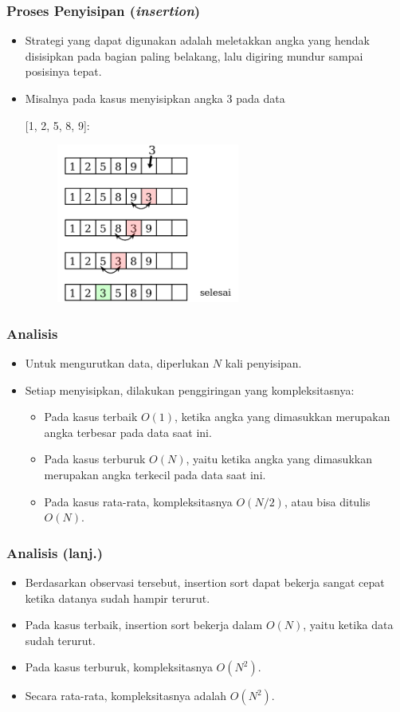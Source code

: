\begin{frame}
\frametitle{Proses Penyisipan (\textit{insertion})}
  \begin{itemize}
    \item Strategi yang dapat digunakan adalah meletakkan angka yang hendak disisipkan pada bagian paling belakang, lalu digiring mundur sampai posisinya tepat.
    \item Misalnya pada kasus menyisipkan angka 3 pada data 
    
    [1, 2, 5, 8, 9]:
    
    \begin{figure}
      \includegraphics[width=6cm]{asset/insertion-sort-2.pdf}
    \end{figure}
  \end{itemize}
\end{frame}

\begin{frame}
\frametitle{Analisis}
  \begin{itemize}
    \item Untuk mengurutkan data, diperlukan $N$ kali penyisipan.
    \item Setiap menyisipkan, dilakukan penggiringan yang kompleksitasnya:
    \begin{itemize}
      \item Pada kasus terbaik $O(1)$, ketika angka yang dimasukkan merupakan angka terbesar pada data saat ini.
      \item Pada kasus terburuk $O(N)$, yaitu ketika angka yang dimasukkan merupakan angka terkecil pada data saat ini.
      \item Pada kasus rata-rata, kompleksitasnya $O(N/2)$, atau bisa ditulis $O(N)$.
    \end{itemize}
  \end{itemize}
\end{frame}

\begin{frame}
\frametitle{Analisis (lanj.)}
  \begin{itemize}
    \item Berdasarkan observasi tersebut, insertion sort dapat bekerja
    sangat cepat ketika datanya sudah hampir terurut.
    \item Pada kasus terbaik, insertion sort bekerja dalam $O(N)$, yaitu
    ketika data sudah terurut.
    \item Pada kasus terburuk, kompleksitasnya $O(N^2)$.
    \item Secara rata-rata, kompleksitasnya adalah $O(N^2)$.
  \end{itemize}
\end{frame}


